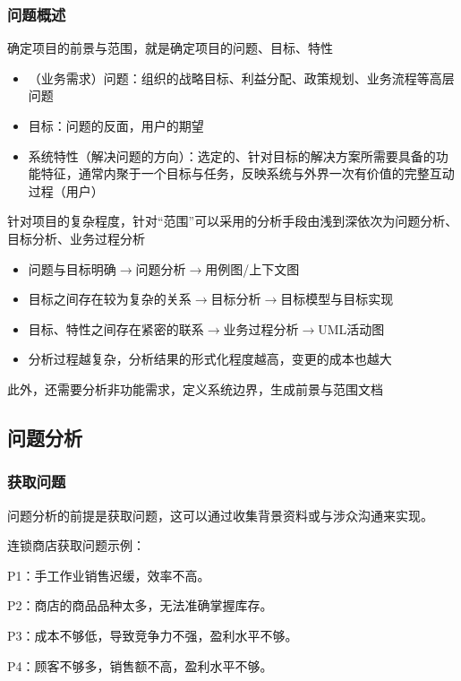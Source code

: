 \subsubsection{问题概述}
确定项目的前景与范围，就是确定项目的问题、目标、特性
\begin{itemize}
    \item （业务需求）问题：组织的战略目标、利益分配、政策规划、业务流程等高层问题
    \item 目标：问题的反面，用户的期望
    \item 系统特性（解决问题的方向）：选定的、针对目标的解决方案所需要具备的功能特征，通常内聚于一个目标与任务，反映系统与外界一次有价值的完整互动过程（用户）
\end{itemize}

针对项目的复杂程度，针对“范围”可以采用的分析手段由浅到深依次为问题分析、目标分析、业务过程分析
\begin{itemize}
    \item 问题与目标明确$\rightarrow$问题分析$\rightarrow$用例图/上下文图
    \item 目标之间存在较为复杂的关系$\rightarrow$目标分析$\rightarrow$目标模型与目标实现
    \item 目标、特性之间存在紧密的联系$\rightarrow$业务过程分析$\rightarrow$UML活动图
    \item 分析过程越复杂，分析结果的形式化程度越高，变更的成本也越大
\end{itemize}

此外，还需要分析非功能需求，定义系统边界，生成前景与范围文档

\subsection{问题分析}

\subsubsection{获取问题}
问题分析的前提是获取问题，这可以通过收集背景资料或与涉众沟通来实现。

连锁商店获取问题示例：
\vspace{-0.25em}
{\kaishu \begin{compactitem}
    \item P1：手工作业销售迟缓，效率不高。
    \item P2：商店的商品品种太多，无法准确掌握库存。
    \item P3：成本不够低，导致竞争力不强，盈利水平不够。
    \item P4：顾客不够多，销售额不高，盈利水平不够。
\end{compactitem}}

